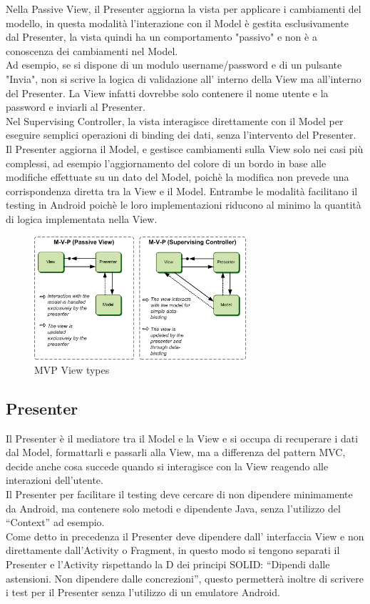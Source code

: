   Nella Passive View, il Presenter aggiorna la vista per applicare i cambiamenti del modello, in questa modalità l'interazione con il Model è gestita esclusivamente dal Presenter, la vista quindi ha un comportamento "passivo" e non è a conoscenza dei cambiamenti nel Model.\\
   Ad esempio, se si dispone di un modulo username/password e di un pulsante "Invia", non si scrive la logica di validazione all' interno della View ma all'interno del Presenter. La View infatti dovrebbe solo contenere il nome utente e la password e inviarli al Presenter.\\
   Nel Supervising Controller, la vista interagisce direttamente con il Model per eseguire semplici operazioni di binding dei dati, senza l'intervento del Presenter.
   \newpage
   Il Presenter aggiorna il Model, e gestisce cambiamenti sulla View solo nei casi più complessi, ad esempio l'aggiornamento del colore di un bordo in base alle modifiche effettuate su un dato del Model, poichè la modifica non prevede una corrispondenza diretta tra la View e il Model.
   Entrambe le modalità facilitano il testing in Android poichè le loro implementazioni riducono al minimo la quantità di logica implementata nella View.

   \begin{figure}[!hb]
     \centering
     \includegraphics[width=0.7\textwidth]{immagini/mvp_view_types.png}
     \caption{MVP View types}\label{fig:Model View Types}
   \end{figure}


   \subsection{Presenter}
   Il Presenter è il mediatore tra il Model e la View e si occupa di  recuperare i dati dal Model, formattarli e passarli alla View, ma a differenza del pattern MVC, decide anche cosa succede quando si interagisce con la View reagendo alle interazioni dell'utente.\\
   Il Presenter per facilitare il testing deve cercare di non dipendere minimamente da Android, ma contenere solo metodi e dipendente Java, senza l'utilizzo del ``Context'' ad esempio.\\
   Come detto in precedenza il Presenter deve dipendere dall' interfaccia View e non direttamente dall'Activity o Fragment, in questo modo si tengono separati il Presenter e l'Activity rispettando la D dei principi SOLID: ``Dipendi dalle astensioni. Non dipendere dalle concrezioni'', questo permetterà inoltre di scrivere i test per il Presenter senza l'utilizzo di un emulatore Android.


